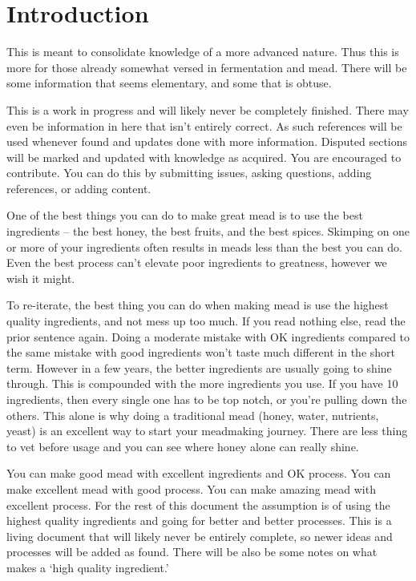 \section{Introduction}
 This is meant to consolidate knowledge of a more advanced nature. Thus this is more for those already somewhat 
 versed in fermentation and mead. There will be some information that seems elementary, and some that is obtuse.

 This is a work in progress and will likely never be completely finished. There may even be information in
 here that isn't entirely correct. As such references will be used whenever found and updates done with more 
 information. Disputed sections will be marked and updated with knowledge as acquired. You are encouraged to 
 contribute. You can do this by submitting issues, asking questions, adding references, or adding content.

 One of the best things you can do to make great mead is to use the best ingredients -- the best honey, the best 
 fruits, and the best spices. Skimping on one or more of your ingredients often results in meads less than the 
 best you can do. Even the best process can't elevate poor ingredients to greatness, however we wish it might.

 To re-iterate, the best thing you can do when making mead is use the highest quality ingredients, and not mess
 up too much. If you read nothing else, read the prior sentence again. Doing a moderate mistake with OK ingredients
 compared to the same mistake with good ingredients won't taste much different in the short term. However in a few
 years, the better ingredients are usually going to shine through. This is compounded with the more ingredients you
 use. If you have 10 ingredients, then every single one has to be top notch, or you're pulling down the others.
 This alone is why doing a traditional mead (honey, water, nutrients, yeast) is an excellent way to start your
 meadmaking journey. There are less thing to vet before usage and you can see where honey alone can really shine.

 You can make good mead with excellent ingredients and OK process. You can make excellent mead with good process. You
 can make amazing mead with excellent process. For the rest of this document the assumption is of using the highest
 quality ingredients and going for better and better processes. This is a living document that will likely never 
 be entirely complete, so newer ideas and processes will be added as found.
 There will be also be some notes on what makes a `high quality ingredient.'

 